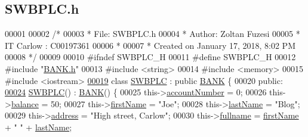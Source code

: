 \hypertarget{_s_w_b_p_l_c_8h_source}{}\subsection{S\+W\+B\+P\+L\+C.\+h}

\begin{DoxyCode}
00001 
00002 \textcolor{comment}{/* }
00003 \textcolor{comment}{ * File:   SWBPLC.h}
00004 \textcolor{comment}{ * Author: Zoltan Fuzesi}
00005 \textcolor{comment}{ * IT Carlow : C00197361}
00006 \textcolor{comment}{ *}
00007 \textcolor{comment}{ * Created on January 17, 2018, 8:02 PM}
00008 \textcolor{comment}{ */}
00009 
00010 \textcolor{preprocessor}{#ifndef SWBPLC\_H}
00011 \textcolor{preprocessor}{#define SWBPLC\_H}
00012 \textcolor{preprocessor}{#include "\hyperlink{_b_a_n_k_8h}{BANK.h}"}
00013 \textcolor{preprocessor}{#include <string>}
00014 \textcolor{preprocessor}{#include <memory>}
00015 \textcolor{preprocessor}{#include <iostream>}
\hypertarget{_s_w_b_p_l_c_8h_source.tex_l00019}{}\hyperlink{class_s_w_b_p_l_c}{00019} \textcolor{keyword}{class }\hyperlink{class_s_w_b_p_l_c}{SWBPLC} : \textcolor{keyword}{public} \hyperlink{class_b_a_n_k}{BANK} \{
00020 \textcolor{keyword}{public}:
\hypertarget{_s_w_b_p_l_c_8h_source.tex_l00024}{}\hyperlink{class_s_w_b_p_l_c_a320f4e2b023038668d941ce5d0c46aeb_a320f4e2b023038668d941ce5d0c46aeb}{00024}     \hyperlink{class_s_w_b_p_l_c_a320f4e2b023038668d941ce5d0c46aeb_a320f4e2b023038668d941ce5d0c46aeb}{SWBPLC}() : \hyperlink{class_b_a_n_k}{BANK}() \{
00025         this->\hyperlink{class_s_w_b_p_l_c_a5d03f989254b88bdb7eb3deeec7e4217_a5d03f989254b88bdb7eb3deeec7e4217}{accountNumber} = 0;
00026         this->\hyperlink{class_s_w_b_p_l_c_a34365efdc6dde37a4da9a6222dcde389_a34365efdc6dde37a4da9a6222dcde389}{balance} = 50;
00027         this->\hyperlink{class_s_w_b_p_l_c_a38fd4817afe4aaac4993b0b4c7074b9c_a38fd4817afe4aaac4993b0b4c7074b9c}{firstName} = \textcolor{stringliteral}{"Joe"};
00028         this->\hyperlink{class_s_w_b_p_l_c_aa06b2e569dd1fef8e43dfda1b34d67f3_aa06b2e569dd1fef8e43dfda1b34d67f3}{lastName} = \textcolor{stringliteral}{"Blog"};
00029         this->\hyperlink{class_s_w_b_p_l_c_a86edad3cbbc5903c8ab8a45b22c0dd15_a86edad3cbbc5903c8ab8a45b22c0dd15}{address} = \textcolor{stringliteral}{"High street, Carlow"};
00030         this->\hyperlink{class_s_w_b_p_l_c_a5de90ba5cac0107fa5361458a0df839e_a5de90ba5cac0107fa5361458a0df839e}{fullname} = \hyperlink{class_s_w_b_p_l_c_a38fd4817afe4aaac4993b0b4c7074b9c_a38fd4817afe4aaac4993b0b4c7074b9c}{firstName} + \textcolor{stringliteral}{" "} + \hyperlink{class_s_w_b_p_l_c_aa06b2e569dd1fef8e43dfda1b34d67f3_aa06b2e569dd1fef8e43dfda1b34d67f3}{lastName};

\end{DoxyCode}
